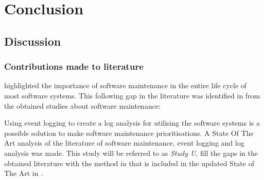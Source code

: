\chapter{Conclusion}
\label{chap:4}

\section{Discussion}

\subsection{Contributions made to literature}
 highlighted the importance of software maintenance in the entire life cycle of most software systems. This following gap in the literature was identified in  from the obtained studies about software maintenance: 

\begin{center}
	\begin{tcolorbox}[colback=lightgray, colframe=black, sharp corners=all, arc=4pt]
		\begin{minipage}{\textwidth}
			\RaggedRight\textit{\studyGap}
		\end{minipage}
	\end{tcolorbox}
\end{center}

Using event logging to create a log analysis for utilising the software systems is a possible solution to make software maintenance prioritisations. A State Of The Art analysis of  the literature of software maintenance, event logging and log analysis was made. This study will be referred to as \textit{Study U}, fill the gaps in the obtained literature with the method in  that is included in the updated State of The Art in .

